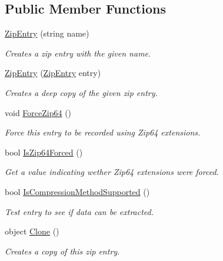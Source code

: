 \subsection*{Public Member Functions}
\begin{DoxyCompactItemize}
\item 
\hyperlink{class_i_c_sharp_code_1_1_sharp_zip_lib_1_1_zip_1_1_zip_entry_a0964e8db6ee84b427a99c5439c37104a}{Zip\+Entry} (string name)
\begin{DoxyCompactList}\small\item\em Creates a zip entry with the given name. \end{DoxyCompactList}\item 
\hyperlink{class_i_c_sharp_code_1_1_sharp_zip_lib_1_1_zip_1_1_zip_entry_a6bbb789c245e55161cbfb08d0754b126}{Zip\+Entry} (\hyperlink{class_i_c_sharp_code_1_1_sharp_zip_lib_1_1_zip_1_1_zip_entry}{Zip\+Entry} entry)
\begin{DoxyCompactList}\small\item\em Creates a deep copy of the given zip entry. \end{DoxyCompactList}\item 
void \hyperlink{class_i_c_sharp_code_1_1_sharp_zip_lib_1_1_zip_1_1_zip_entry_a4cc13a9e0dc8a7176eeff410dc462c86}{Force\+Zip64} ()
\begin{DoxyCompactList}\small\item\em Force this entry to be recorded using Zip64 extensions. \end{DoxyCompactList}\item 
bool \hyperlink{class_i_c_sharp_code_1_1_sharp_zip_lib_1_1_zip_1_1_zip_entry_a1dac769cb20f363a6d1c53c0dade36d9}{Is\+Zip64\+Forced} ()
\begin{DoxyCompactList}\small\item\em Get a value indicating wether Zip64 extensions were forced. \end{DoxyCompactList}\item 
bool \hyperlink{class_i_c_sharp_code_1_1_sharp_zip_lib_1_1_zip_1_1_zip_entry_a472828fa6521baf1ae8515b7b6753d16}{Is\+Compression\+Method\+Supported} ()
\begin{DoxyCompactList}\small\item\em Test entry to see if data can be extracted. \end{DoxyCompactList}\item 
object \hyperlink{class_i_c_sharp_code_1_1_sharp_zip_lib_1_1_zip_1_1_zip_entry_a475643d6fac14598ae4b1214c20b2229}{Clone} ()
\begin{DoxyCompactList}\small\item\em Creates a copy of this zip entry. \end{DoxyCompactList}\item 

\end{DoxyCompactItemize}
